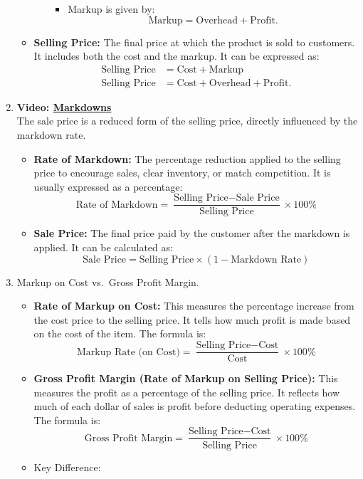 \documentclass[
]{book}
\providecommand{\tightlist}{%
  \setlength{\itemsep}{0pt}\setlength{\parskip}{0pt}}
\begin{document}
\begin{enumerate}
\begin{itemize}
\begin{itemize}
      \begin{itemize}
      \tightlist
      \item
        Markup is given by: \[ \text{Markup} = \text{Overhead} + \text{Profit}.\]
      \end{itemize}
    \end{itemize}
  \item
    \textbf{Selling Price:} The final price at which the product is sold to customers. It includes both the cost and the markup. It can be expressed as:
    \begin{align*}
     \text{Selling Price} &= \text{Cost} + \text{Markup}\\
     \text{Selling Price} &= \text{Cost} + \text{Overhead} + \text{Profit}.
     \end{align*}
  \end{itemize}
\item
  \textbf{Video: \href{https://youtu.be/GfI57rP47R4}{Markdowns}}\\
  The sale price is a reduced form of the selling price, directly influenced by the markdown rate.

  \begin{itemize}
  \tightlist
  \item
    \textbf{Rate of Markdown:} The percentage reduction applied to the selling price to encourage sales, clear inventory, or match competition. It is usually expressed as a percentage:
    \[
     \text{Rate of Markdown} = \frac{\text{Selling Price} - \text{Sale Price}}{\text{Selling Price}} \times 100\%
     \]
  \item
    \textbf{Sale Price:} The final price paid by the customer after the markdown is applied. It can be calculated as:
    \[
     \text{Sale Price} = \text{Selling Price} \times (1 - \text{Markdown Rate})
     \]
  \end{itemize}
\item
  Markup on Cost vs.~Gross Profit Margin.

  \begin{itemize}
  \tightlist
  \item
    \textbf{Rate of Markup on Cost:} This measures the percentage increase from the cost price to the selling price. It tells how much profit is made based on the cost of the item. The formula is:
    \[
     \text{Markup Rate (on Cost)} = \frac{\text{Selling Price} - \text{Cost}}{\text{Cost}} \times 100\%
     \]
  \item
    \textbf{Gross Profit Margin (Rate of Markup on Selling Price):} This measures the profit as a percentage of the selling price. It reflects how much of each dollar of sales is profit before deducting operating expenses. The formula is:
    \[
     \text{Gross Profit Margin} = \frac{\text{Selling Price} - \text{Cost}}{\text{Selling Price}} \times 100\%
     \]
  \item
    Key Difference:


\end{itemize}
\end{enumerate}
\end{document}
